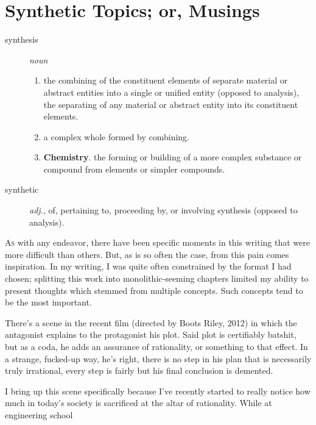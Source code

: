 \documentclass[../butidigress.tex]{subfiles}
\begin{document}
\chapter{Synthetic Topics; or, Musings}\label{chap:synthetic}
\newpage

\begin{description}
    \item [synthesis] \textit{noun}
    \begin{enumerate}
        \item the combining of the constituent elements of separate material or abstract entities into a single or unified entity (opposed to analysis), the separating of any material or abstract entity into its constituent elements.
        \item a complex whole formed by combining.
        \item \textbf{Chemistry}. the forming or building of a more complex substance or compound from elements or simpler compounds.
    \end{enumerate}
    \item [synthetic] \textit{adj.}, of, pertaining to, proceeding by, or involving synthesis (opposed to analysis).
\end{description}

\lettrine{A}{s} with any endeavor, there have been specific moments in this writing that were more difficult than others.
But, as is so often the case, from this pain comes inspiration.
In my writing, I was quite often constrained by the format I had chosen; splitting this work into monolithic-seeming chapters limited my ability to present thoughts which stemmed from multiple concepts.
Such concepts tend to be the most important.

There's a scene in the recent film  (directed by Boots Riley, 2012) in which the antagonist explains to the protagonist his plot.
Said plot is certifiably batshit, but as a coda, he adds an assurance of rationality,  or something to that effect.
In a strange, fucked-up way, he's right, there is no step in his plan that is necessarily truly irrational, every step is fairly  but his final conclusion is demented.

I bring up this scene specifically because I've recently started to really notice how much in today's society is sacrificed at the altar of rationality.
While at engineering school\lips
\end{document}
